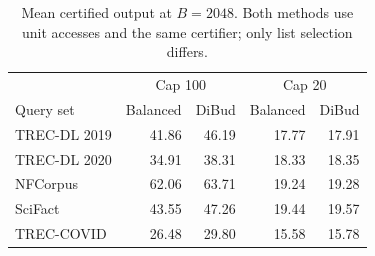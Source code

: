 \begin{table}[H]
\centering
\caption{Mean certified output at $B=2048$. Both methods use unit accesses and the same certifier; only list selection differs.}
\label{tab:yield}
\small
\setlength{\tabcolsep}{3pt}
\begin{tabular}{lrrrr}
\toprule
& \multicolumn{2}{c}{Cap 100} & \multicolumn{2}{c}{Cap 20} \\ Query set & Balanced & DiBud & Balanced & DiBud \\
\midrule
TREC-DL 2019 & 41.86 & 46.19 & 17.77 & 17.91 \\
TREC-DL 2020 & 34.91 & 38.31 & 18.33 & 18.35 \\
NFCorpus & 62.06 & 63.71 & 19.24 & 19.28 \\
SciFact & 43.55 & 47.26 & 19.44 & 19.57 \\
TREC-COVID & 26.48 & 29.80 & 15.58 & 15.78 \\
\bottomrule
\end{tabular}
\end{table}

